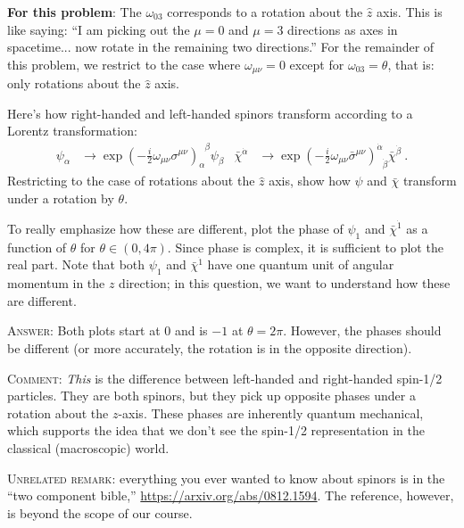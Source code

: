 \documentclass[12pt]{article}
\begin{document}
\textbf{For this problem}: The $\omega_{03}$ corresponds to a rotation about the $\hat z$ axis. This is like saying: ``I am picking out the $\mu = 0$ and $\mu = 3$ directions as axes in spacetime... now rotate in the remaining two directions.'' For the remainder of this problem, we restrict to the case where $\omega_{\mu\nu} = 0$ except for $\omega_{03} = \theta$, that is: only rotations about the $\hat z$ axis.

Here's how right-handed and left-handed spinors transform according to a Lorentz transformation:
\begin{align}
	\psi_\alpha &\to \exp\left(
		-\frac i2 \omega_{\mu\nu} \sigma^{\mu\nu}\right)_\alpha^{\phantom\alpha \beta} \psi_\beta
	&
	\bar\chi^{\dot\alpha}
	&\to \exp\left(-\frac i2 \omega_{\mu\nu} \bar\sigma^{\mu\nu}\right)^{\dot\alpha}_{\phantom\alpha \dot\beta} \bar\chi^{\dot\beta} \ .
\end{align}
Restricting to the case of rotations about the $\hat z$ axis, show how $\psi$ and $\bar\chi$ transform under a rotation by $\theta$. 

To really emphasize how these are different, plot the phase of $\psi_1$ and $\bar\chi^{\dot 1}$ as a function of $\theta$ for $\theta \in (0, 4\pi)$. Since phase is complex, it is sufficient to plot the real part. Note that both $\psi_1$ and $\bar\chi^{\dot 1}$ have one quantum unit of angular momentum in the $z$ direction; in this question, we want to understand how these are different.

\textsc{Answer}: Both plots start at 0 and is $-1$ at $\theta = 2\pi$. However, the phases should be different (or more accurately, the rotation is in the opposite direction). 

\textsc{Comment}: \emph{This} is the difference between left-handed and right-handed spin-1/2 particles. They are both spinors, but they pick up opposite phases under a rotation about the $z$-axis. These phases are inherently quantum mechanical, which supports the idea that we don't see the spin-1/2 representation in the classical (macroscopic) world. 

\textsc{Unrelated remark}: everything you ever wanted to know about spinors is in the ``two component bible,'' \url{https://arxiv.org/abs/0812.1594}. The reference, however, is beyond the scope of our course.

\end{document}
